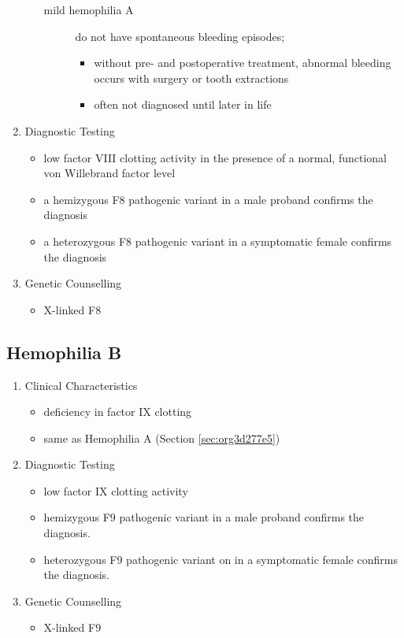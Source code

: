 \documentclass[12pt]{scrartcl}
\begin{document}
\begin{enumerate}
\begin{itemize}
\begin{description}
\item[{mild hemophilia A }] do not have spontaneous bleeding episodes;
\begin{itemize}
\item without pre- and postoperative treatment, abnormal bleeding occurs with surgery
or tooth extractions
\item often not diagnosed until later in life
\end{itemize}
\end{description}
\end{itemize}
\item Diagnostic Testing
\label{sec:orga122216}
\begin{itemize}
\item low factor VIII clotting activity in the presence of a normal,
functional von Willebrand factor level
\item a hemizygous F8 pathogenic variant in a male proband confirms the
diagnosis
\item a heterozygous F8 pathogenic variant in a symptomatic female
confirms the diagnosis
\end{itemize}
\item Genetic Counselling
\label{sec:org726f0fa}
\begin{itemize}
\item X-linked F8
\end{itemize}
\end{enumerate}

\subsection{Hemophilia B}
\label{sec:org58f516b}
\begin{enumerate}
\item Clinical Characteristics
\label{sec:orgf3e7bc1}
\begin{itemize}
\item deficiency in factor IX clotting
\item same as Hemophilia A (Section \ref{sec:org3d277e5})
\end{itemize}
\item Diagnostic Testing
\label{sec:org771835d}
\begin{itemize}
\item low factor IX clotting activity
\item hemizygous F9 pathogenic variant in a male proband confirms the
diagnosis.
\item heterozygous F9 pathogenic variant on in a symptomatic female
confirms the diagnosis.
\end{itemize}
\item Genetic Counselling
\label{sec:org49aeb26}
\begin{itemize}
\item X-linked F9
\end{itemize}
\end{enumerate}
\end{document}
